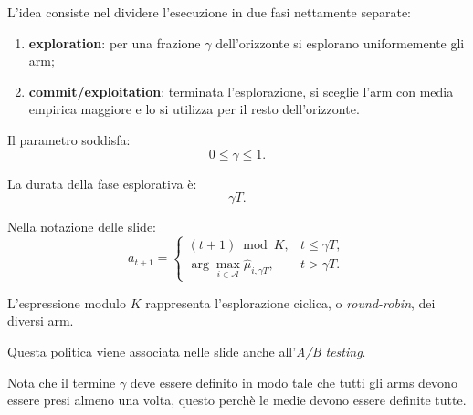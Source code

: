 L'idea consiste nel dividere l'esecuzione in due fasi nettamente separate:
\begin{enumerate}
    \item \textbf{exploration}: per una frazione $\gamma$ dell'orizzonte si esplorano uniformemente gli arm;
    \item \textbf{commit/exploitation}: terminata l'esplorazione, si sceglie l'arm con media empirica maggiore e lo si utilizza per il resto dell'orizzonte.
\end{enumerate}

Il parametro soddisfa:
\[
0\leq\gamma\leq1.
\]

La durata della fase esplorativa è:
\[
\gamma T.
\]

Nella notazione delle slide:
\[
a_{t+1}
=
\begin{cases}
(t+1)\bmod K,
& t\leq\gamma T,\\[1ex]
\displaystyle
\arg\max_{i\in\mathcal{A}}
\widehat{\mu}_{i,\gamma T},
& t>\gamma T.
\end{cases}
\]

L'espressione modulo $K$ rappresenta l'esplorazione ciclica, o \emph{round-robin}, dei diversi arm.

Questa politica viene associata nelle slide anche all'\emph{A/B testing}.

\begin{warning}{}
    Nota che il termine $\gamma$ deve essere definito in modo tale che tutti gli arms devono essere presi almeno una volta, questo perchè le medie devono essere definite tutte.
\end{warning}



